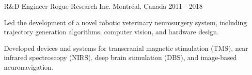\begin{cventries}
\cventry
{R\&D Engineer}
{Rogue Research Inc.}
{Montréal, Canada}
{2011 - 2018}
{
\begin{cvitems}
\item{Led the development of a novel robotic veterinary neurosurgery system, including trajectory generation algorithms, computer vision, and hardware design.}
\item{Developed devices and systems for transcranial magnetic stimulation (TMS), near infrared spectroscopy (NIRS), deep brain stimulation (DBS), and image-based neuronavigation.}
\end{cvitems}
}

\end{cventries}
